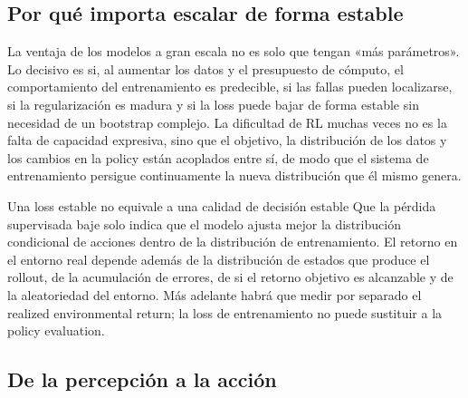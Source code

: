 \subsection{Por qué importa escalar de forma estable}

La ventaja de los modelos a gran escala no es solo que tengan «más parámetros». Lo decisivo es si, al aumentar los datos y el presupuesto de cómputo, el comportamiento del entrenamiento es predecible, si las fallas pueden localizarse, si la regularización es madura y si la loss puede bajar de forma estable sin necesidad de un bootstrap complejo. La dificultad de RL muchas veces no es la falta de capacidad expresiva, sino que el objetivo, la distribución de los datos y los cambios en la policy están acoplados entre sí, de modo que el sistema de entrenamiento persigue continuamente la nueva distribución que él mismo genera.



\begin{warningbox}{Una loss estable no equivale a una calidad de decisión estable}
Que la pérdida supervisada baje solo indica que el modelo ajusta mejor la distribución condicional de acciones dentro de la distribución de entrenamiento. El retorno en el entorno real depende además de la distribución de estados que produce el rollout, de la acumulación de errores, de si el retorno objetivo es alcanzable y de la aleatoriedad del entorno. Más adelante habrá que medir por separado el realized environmental return; la loss de entrenamiento no puede sustituir a la policy evaluation.
\end{warningbox}

\subsection{De la percepción a la acción}

